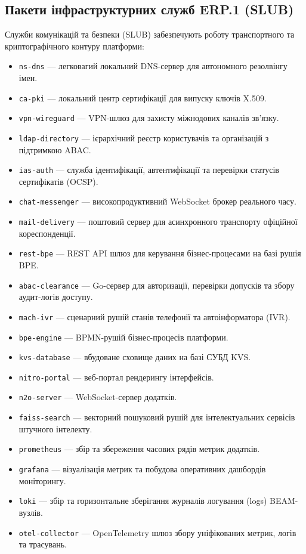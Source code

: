 \subsection{Пакети інфраструктурних служб ERP.1 (SLUB)}
Служби комунікацій та безпеки (SLUB) забезпечують роботу транспортного та криптографічного контуру платформи:
\begin{itemize}
    \item \texttt{ns-dns} --- легковагий локальний DNS-сервер для автономного резолвінгу імен.
    \item \texttt{ca-pki} --- локальний центр сертифікації для випуску ключів X.509.
    \item \texttt{vpn-wireguard} --- VPN-шлюз для захисту міжнодових каналів зв'язку.
    \item \texttt{ldap-directory} --- ієрархічний реєстр користувачів та організацій з підтримкою ABAC.
    \item \texttt{ias-auth} --- служба ідентифікації, автентифікації та перевірки статусів сертифікатів (OCSP).
    \item \texttt{chat-messenger} --- високопродуктивний WebSocket брокер реального часу.
    \item \texttt{mail-delivery} --- поштовий сервер для асинхронного транспорту офіційної кореспонденції.
    \item \texttt{rest-bpe} --- REST API шлюз для керування бізнес-процесами на базі рушія BPE.
    \item \texttt{abac-clearance} --- Go-сервер для авторизації, перевірки допусків та збору аудит-логів доступу.
    \item \texttt{mach-ivr} --- сценарний рушій станів телефонії та автоінформатора (IVR).
    \item \texttt{bpe-engine} --- BPMN-рушій бізнес-процесів платформи.
    \item \texttt{kvs-database} --- вбудоване сховище даних на базі СУБД KVS.
    \item \texttt{nitro-portal} --- веб-портал рендерингу інтерфейсів.
    \item \texttt{n2o-server} --- WebSocket-сервер додатків.
    \item \texttt{faiss-search} --- векторний пошуковий рушій для інтелектуальних сервісів штучного інтелекту.
    \item \texttt{prometheus} --- збір та збереження часових рядів метрик додатків.
    \item \texttt{grafana} --- візуалізація метрик та побудова оперативних дашбордів моніторингу.
    \item \texttt{loki} --- збір та горизонтальне зберігання журналів логування (logs) BEAM-вузлів.
    \item \texttt{otel-collector} --- OpenTelemetry шлюз збору уніфікованих метрик, логів та трасувань.
\end{itemize}

